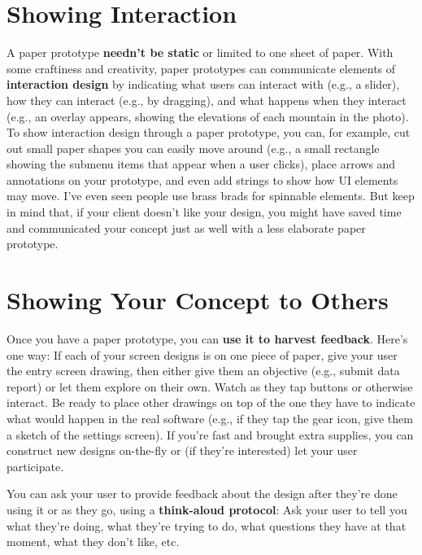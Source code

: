 \section{Showing Interaction}

A paper prototype \textbf{needn't be static} or limited to one sheet of paper. With some craftiness and creativity, paper prototypes can communicate elements of \textbf{interaction design}\marginpar{\interactionDesignDef} by indicating what users can interact with (e.g., a slider), how they can interact (e.g., by dragging), and what happens when they interact (e.g., an overlay appears, showing the elevations of each mountain in the photo). To show interaction design through a paper prototype, you can, for example, cut out small paper shapes you can easily move around (e.g., a small rectangle showing the submenu items that appear when a user clicks), place arrows and annotations on your prototype, and even add strings to show how UI elements may move. I've even seen people use brass brads for spinnable elements. But keep in mind that, if your client doesn't like your design, you might have saved time and communicated your concept just as well with a less elaborate paper prototype.

\section{Showing Your Concept to Others}

\marginpar{\thinkAloudProtocolDef}Once you have a paper prototype, you can \textbf{use it to harvest feedback}. Here's one way: If each of your screen designs is on one piece of paper, give your user the entry screen drawing, then either give them an objective (e.g., submit data report) or let them explore on their own. Watch as they tap buttons or otherwise interact. Be ready to place other drawings on top of the one they have to indicate what would happen in the real software (e.g., if they tap the gear icon, give them a sketch of the settings screen). If you're fast and brought extra supplies, you can construct new designs on-the-fly or (if they're interested) let your user participate. 

You can ask your user to provide feedback about the design after they're done using it or as they go, using a \textbf{think-aloud protocol}: Ask your user to tell you what they're doing, what they're trying to do, what questions they have at that moment, what they don't like, etc.

\nomargins
